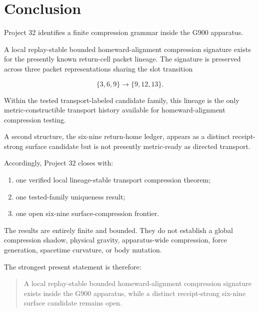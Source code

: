 \section{Conclusion}

Project 32 identifies a finite compression grammar inside the G900 apparatus.

A local replay-stable bounded homeward-alignment compression signature exists
for the presently known return-cell packet lineage. The signature is preserved
across three packet representations sharing the slot transition

\[
\{3,6,9\} \rightarrow \{9,12,13\}.
\]

Within the tested transport-labeled candidate family, this lineage is the
only metric-constructible transport history available for homeward-alignment
compression testing.

A second structure, the six-nine return-home ledger, appears as a distinct
receipt-strong surface candidate but is not presently metric-ready as directed
transport.

Accordingly, Project 32 closes with:

\begin{enumerate}
\item one verified local lineage-stable transport compression theorem;
\item one tested-family uniqueness result;
\item one open six-nine surface-compression frontier.
\end{enumerate}

The results are entirely finite and bounded. They do not establish a global
compression shadow, physical gravity, apparatus-wide compression, force
generation, spacetime curvature, or body mutation.

The strongest present statement is therefore:

\begin{quote}
A local replay-stable bounded homeward-alignment compression signature exists
inside the G900 apparatus, while a distinct receipt-strong six-nine surface
candidate remains open.
\end{quote}
